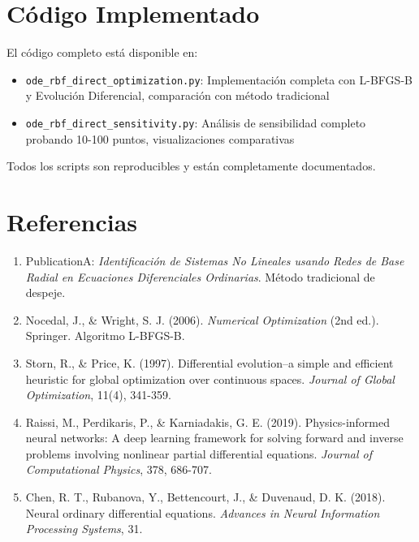 \documentclass[11pt,a4paper]{article}
\begin{document}
\section{Código Implementado}

El código completo está disponible en:

\begin{itemize}
    \item \texttt{ode\_rbf\_direct\_optimization.py}: Implementación completa con L-BFGS-B y Evolución Diferencial, comparación con método tradicional

    \item \texttt{ode\_rbf\_direct\_sensitivity.py}: Análisis de sensibilidad completo probando 10-100 puntos, visualizaciones comparativas
\end{itemize}

Todos los scripts son reproducibles y están completamente documentados.

\section*{Referencias}

\begin{enumerate}
    \item PublicationA: \textit{Identificación de Sistemas No Lineales usando Redes de Base Radial en Ecuaciones Diferenciales Ordinarias}. Método tradicional de despeje.

    \item Nocedal, J., \& Wright, S. J. (2006). \textit{Numerical Optimization} (2nd ed.). Springer. Algoritmo L-BFGS-B.

    \item Storn, R., \& Price, K. (1997). Differential evolution–a simple and efficient heuristic for global optimization over continuous spaces. \textit{Journal of Global Optimization}, 11(4), 341-359.

    \item Raissi, M., Perdikaris, P., \& Karniadakis, G. E. (2019). Physics-informed neural networks: A deep learning framework for solving forward and inverse problems involving nonlinear partial differential equations. \textit{Journal of Computational Physics}, 378, 686-707.

    \item Chen, R. T., Rubanova, Y., Bettencourt, J., \& Duvenaud, D. K. (2018). Neural ordinary differential equations. \textit{Advances in Neural Information Processing Systems}, 31.
\end{enumerate}
\end{document}
